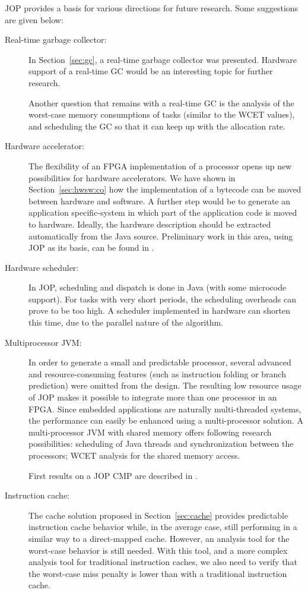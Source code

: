 JOP provides a basis for various directions for future research.
Some suggestions are given below:
%
\begin{description}
    \item[Real-time garbage collector:]
In Section~\ref{sec:gc}, a real-time garbage collector was
presented. Hardware support of a real-time GC would be an
interesting topic for further research.

Another question that remains with a real-time GC is the analysis of
the worst-case memory consumptions of tasks (similar to the WCET
values), and scheduling the GC so that it can keep up with the
allocation rate.

    \item[Hardware accelerator:]
The flexibility of an FPGA implementation of a processor opens up
new possibilities for hardware accelerators. We have shown in
Section~\ref{sec:hwsw:co} how the implementation of a bytecode can
be moved between hardware and software. A further step would be to
generate an application specific-system in which part of the
application code is moved to hardware. Ideally, the hardware
description should be extracted automatically from the Java source.
Preliminary work in this area, using JOP as its basis, can be found
in \cite{jop:sac05}.

    \item[Hardware scheduler:]
In JOP, scheduling and dispatch is done in Java (with some microcode
support). For tasks with very short periods, the scheduling
overheads can prove to be too high. A scheduler implemented in
hardware can shorten this time, due to the parallel nature of the
algorithm.

    \item[Multiprocessor JVM:]
In order to generate a small and predictable processor, several
advanced and resource-consuming features (such as instruction
folding or branch prediction) were omitted from the design. The
resulting low resource usage of JOP makes it possible to integrate
more than one processor in an FPGA. Since embedded applications are
naturally multi-threaded systems, the performance can easily be
enhanced using a multi-processor solution. A multi-processor JVM
with shared memory offers following research possibilities:
scheduling of Java threads and synchronization between the
processors; WCET analysis for the shared memory access.

First results on a JOP CMP are described in \cite{jop:dma, jop:cmp}.

    \item[Instruction cache:]
The cache solution proposed in Section~\ref{sec:cache} provides
predictable instruction cache behavior while, in the average case,
still performing in a similar way to a direct-mapped cache. However,
an analysis tool for the worst-case behavior is still needed. With
this tool, and a more complex analysis tool for traditional
instruction caches, we also need to verify that the worst-case miss
penalty is lower than with a traditional instruction cache.


\end{description}
